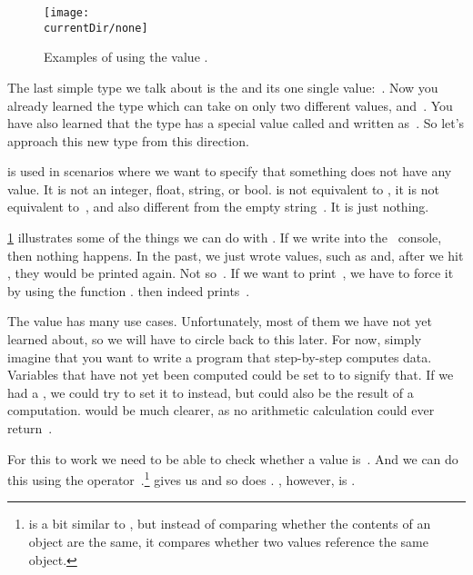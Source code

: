 %
\label{sec:none}%
%
\begin{figure}%
\centering%
\texttt{[image: \\currentDir/none]}%
\caption{Examples of using the value .}%
\label{fig:none}%
\end{figure}%
%
The last simple type we talk about is the  and its one single value:~.
Now you already learned the type  which can take on only two different values,  and~.
You have also learned that the type  has a special value called  and written as~.
So let's approach this new type from this direction.

 is used in scenarios where we want to specify that something does not have any value.
It is not an integer, float, string, or bool.
 is not equivalent to , it is not equivalent to~, and also different from the empty string~.
It is just nothing.

\cref{fig:none} illustrates some of the things we can do with .
If we write  into the \python\ console, then nothing happens.
In the past, we just wrote values, such as  and, after we hit \keys{\enter}, they would be printed again.
Not so~.
If we want to print~, we have to force it by using the function .
 then indeed prints~.

The value  has many use cases.
Unfortunately, most of them we have not yet learned about, so we will have to circle back to this later.
For now, simply imagine that you want to write a program that step-by-step computes data.
Variables that have not yet been computed could be set to  to signify that.
If we had a , we could try to set it to  instead, but  could also be the result of a computation.
 would be much clearer, as no arithmetic calculation could ever return~.

For this to work we need to be able to check whether a value is~.
And we can do this using the operator~.\footnote{%
 is a bit similar to \pythonilIdx{==}, but instead of comparing whether the contents of an object are the same, it compares whether two values reference the same object.}%
 gives us  and so does .
, however, is .

